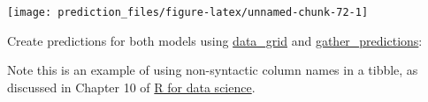 \documentclass[]{book}
\newenvironment{Shaded}{\begin{snugshade}}{\end{snugshade}}
\newcommand{\CharTok}[1]{\textcolor[rgb]{0.31,0.60,0.02}{#1}}
\newcommand{\DataTypeTok}[1]{\textcolor[rgb]{0.13,0.29,0.53}{#1}}
\newcommand{\KeywordTok}[1]{\textcolor[rgb]{0.13,0.29,0.53}{\textbf{#1}}}
\newcommand{\NormalTok}[1]{#1}
\newcommand{\OperatorTok}[1]{\textcolor[rgb]{0.81,0.36,0.00}{\textbf{#1}}}
\newcommand{\StringTok}[1]{\textcolor[rgb]{0.31,0.60,0.02}{#1}}
\theoremstyle{definition}
\theoremstyle{definition}
\theoremstyle{definition}
\theoremstyle{remark}
\begin{document}
\begin{center}\texttt{[image: prediction\_files/figure-latex/unnamed-chunk-72-1]} \end{center}

Create predictions for both models using
\href{https://www.rdocumentation.org/packages/modelr/topics/data_grid}{data\_grid}
and
\href{https://www.rdocumentation.org/packages/modelr/topics/gather_predictions}{gather\_predictions}:

\begin{Shaded}
\end{Shaded}

Note this is an example of using non-syntactic column names in a tibble,
as discussed in Chapter 10 of
\href{http://r4ds.had.co.nz/tibbles.html}{R for data science}.
\end{document}
